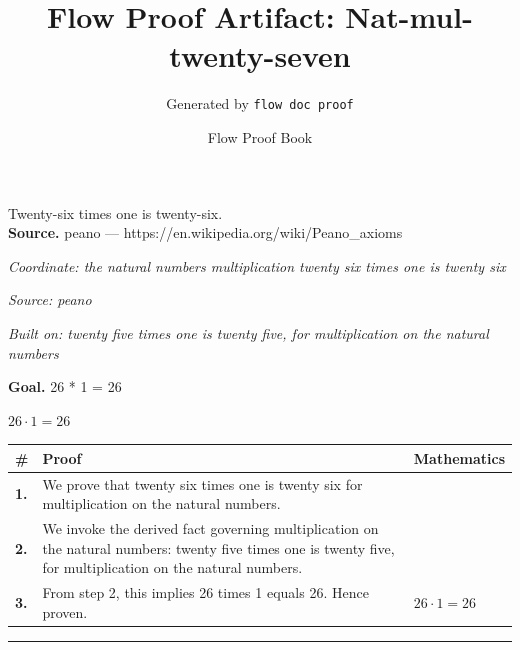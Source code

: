 \documentclass[11pt]{article}
\title{Flow Proof Artifact: Nat-mul-twenty-seven}
\author{Generated by \texttt{flow doc proof}}
\date{Flow Proof Book}
\theoremstyle{definition}
\begin{document}
\maketitle
Twenty-six times one is twenty-six.\\[0.5em]
\textbf{Source.} peano — https://en.wikipedia.org/wiki/Peano\_axioms\\[0.5em]
\bigskip
{}\par
\smallskip\noindent\textit{Coordinate: the natural numbers \cdot multiplication \cdot twenty six times one is twenty six}\par
\smallskip\noindent\textit{Source: peano}\par
\smallskip\noindent\textit{Built on: twenty five times one is twenty five, for multiplication on the natural numbers}\par
\medskip
\noindent\textbf{Goal.} 26 * 1 = 26\par
\noindent$\displaystyle 26 \cdot 1 = 26$\par
\medskip
\noindent
\begin{tabular}{@{} >{\raggedright\arraybackslash}p{} >{\raggedright\arraybackslash}p{} >{\raggedleft\arraybackslash}p{} @{}}
\textbf{\#} & \textbf{Proof} & \textbf{Mathematics} \\
\midrule
\textbf{1.} & We prove that twenty six times one is twenty six for multiplication on the natural numbers. & \\[0.45em]
\textbf{2.} & We invoke the derived fact governing multiplication on the natural numbers: twenty five times one is twenty five, for multiplication on the natural numbers. & \\[0.45em]
\textbf{3.} & From step 2, this implies 26 times 1 equals 26. Hence proven. & $\displaystyle 26 \cdot 1 = 26$ \\[0.45em]
\bottomrule
\end{tabular}
\label{thm:Nat-multiplication-twenty_six_times_one_is_twenty_six}
\par\medskip\hrule
\end{document}
